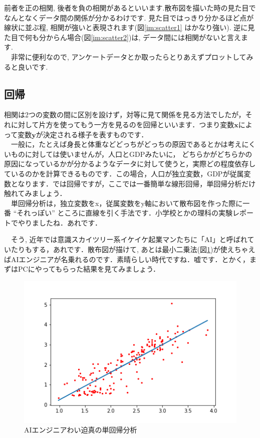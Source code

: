 \documentclass[11pt,a4paper,uplatex]{ujreport}
\begin{document}
前者を正の相関, 後者を負の相関があるといいます.散布図を描いた時の見た目でなんとなくデータ間の関係が分かるわけです. 見た目ではっきり分かるほど点が線状に並ぶ程, 相関が強いと表現されます(図\ref{im:scatter1} はかなり強い). 逆に見た目で何も分からん場合(図\ref{im:scatter2})は, データ間には相関がないと言えます. \\
　非常に便利なので, アンケートデータとか取ったらとりあえずプロットしてみると良いです. 
\\
\subsection{回帰}
相関は2つの変数の間に区別を設けず，対等に見て関係を見る方法でしたが，それに対して片方を使ってもう一方を見るのを回帰といいます．つまり変数$\mathbf{x}$によって変数$\mathbf{y}$が決定される様子を表すものです．\\
　一般に，たとえば身長と体重などどっちがどっちの原因であるとかは考えにくいものに対しては使いませんが，人口とGDPみたいに， どちらかがどちらかの原因になっているかが分かるようなデータに対して使うと，実際どの程度依存しているのかを計算できるものです．この場合，人口が独立変数，GDPが従属変数となります．では回帰ですが，ここでは一番簡単な線形回帰，単回帰分析だけ触れてみましょう．\\

　単回帰分析は，独立変数をx，従属変数をy軸において散布図を作った際に一番 ``それっぽい'' ところに直線を引く手法です．小学校とかの理科の実験レポートでやりましたね．あれです．

　そう, 近年では意識スカイツリー系イケイケ起業マンたちに「AI」と呼ばれていたりもする，あれです．散布図が描けて, あとは最小二乗法(図\ref{im:predict})が使えちゃえばAIエンジニアが名乗れるのです．素晴らしい時代ですね．嘘です．とかく，まずはPCにやってもらった結果を見てみましょう．\\


\begin{figure}[H]
\label{im:predict}
  \centering
  \includegraphics[width=120mm,bb=0 0 432 288]{../figures/predict.png}
  \caption{AIエンジニアわい迫真の単回帰分析}
\end{figure}
\end{document}
